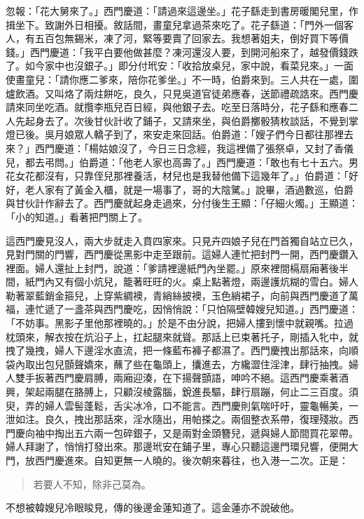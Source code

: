忽報：「花大舅來了。」西門慶道：「請過來這邊坐。」花子繇走到書房暖閣兒里，作揖坐下。致謝外日相擾。敘話間，畫童兒拿過茶來吃了。花子繇道：「門外一個客人，有五百包無錫米，凍了河，緊等要賣了回家去。我想著姐夫，倒好買下等價錢。」西門慶道：「我平白要他做甚麼？凍河還沒人要，到開河船來了，越發價錢跌了。如今家中也沒銀子。」即分付玳安：「收拾放桌兒，家中說，看菜兒來。」一面使畫童兒：「請你應二爹來，陪你花爹坐。」不一時，伯爵來到。三人共在一處，圍爐飲酒。又叫烙了兩炷餅吃，良久，只見吳道官徒弟應春，送節禮疏誥來。西門慶請來同坐吃酒。就攬李瓶兒百日經，與他銀子去。吃至日落時分，花子繇和應春二人先起身去了。次後甘伙計收了鋪子，又請來坐，與伯爵擲骰猜枚談話，不覺到掌燈已後。吳月娘眾人轎子到了，來安走來回話。伯爵道：「嫂子們今日都往那裡去來？」西門慶道：「楊姑娘沒了，今日三日念經，我這裡備了張祭卓，又封了香儀兒，都去弔問。」伯爵道：「他老人家也高壽了。」西門慶道：「敢也有七十五六。男花女花都沒有，只靠侄兒那裡養活，材兒也是我替他備下這幾年了。」伯爵道：「好好，老人家有了黃金入櫃，就是一場事了，哥的大陰騭。」說畢，酒過數巡，伯爵與甘伙計作辭去了。西門慶就起身走過來，分付後生王顯：「仔細火燭。」王顯道：「小的知道。」看著把門關上了。

這西門慶見沒人，兩大步就走入賁四家來。只見卉四娘子兒在門首獨自站立已久，見對門關的門響，西門慶從黑影中走至跟前。這婦人連忙把封門一開，西門慶鑽入裡面。婦人還扯上封門，說道：「爹請裡邊紙門內坐罷。」原來裡間槅扇廂著後半間，紙門內又有個小炕兒，籠著旺旺的火。桌上點著燈，兩邊護炕糊的雪白。婦人勒著翠藍銷金箍兒，上穿紫綢襖，青綃絲披襖，玉色綃裙子，向前與西門慶道了萬福，連忙遞了一盞茶與西門慶吃，因悄悄說：「只怕隔壁韓嫂兒知道。」西門慶道：「不妨事。黑影子里他那裡曉的。」於是不由分說，把婦人摟到懷中就親嘴。拉過枕頭來，解衣按在炕沿子上，扛起腿來就聳。那話上已束著托子，剛插入牝中，就拽了幾拽，婦人下邊淫水直流，把一條藍布褲子都濕了。西門慶拽出那話來，向順袋內取出包兒顫聲嬌來，蘸了些在龜頭上，攮進去，方纔澀住淫津，肆行抽拽。婦人雙手扳著西門慶肩膊，兩廂迎湊，在下揚聲顫語，呻吟不絕。這西門慶乘著酒興，架起兩腿在胳膊上，只顧沒棱露腦，銳進長驅，肆行扇蹦，何止二三百度。須臾，弄的婦人雲髻蓬鬆，舌尖冰冷，口不能言。西門慶則氣喘吁吁，靈龜暢美，一泄如注。良久，拽出那話來，淫水隨出，用帕搽之。兩個整衣系帶，復理殘妝。西門慶向袖中掏出五六兩一包碎銀子，又是兩對金頭簪兒，遞與婦人節間買花翠帶。婦人拜謝了，悄悄打發出來。那邊玳安在鋪子里，專心只聽這邊門環兒響，便開大門，放西門慶進來。自知更無一人曉的。後次朝來暮往，也入港一二次。正是：
\begin{quote}
若要人不知，除非己莫為。
\end{quote}
不想被韓嫂兒冷眼睃見，傳的後邊金蓮知道了。這金蓮亦不說破他。

